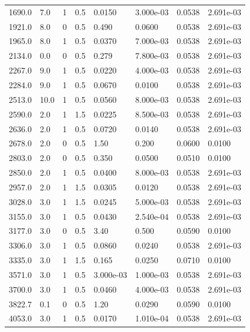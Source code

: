 \documentclass[preview]{standalone}
\begin{document}
{{\begin{tabular}{L{1.2cm}C{1.2cm} C{0.3cm}C{0.5cm} C{1.4cm}C{1.4cm} C{1.4cm}C{1.4cm}}
  1690.0  &   7.0  & 1     & 0.5 &  0.0150  & 3.000e-03  & 0.0538 &  2.691e-03   \\ 
  1921.0  &   8.0  & 0     & 0.5 &  0.490  & 0.0600  & 0.0538 &  2.691e-03   \\ 
  1965.0  &   8.0  & 1     & 0.5 &  0.0370  & 7.000e-03  & 0.0538 &  2.691e-03   \\ 
  2134.0  &   0.0  & 0     & 0.5 &  0.279  & 7.800e-03  & 0.0538 &  2.691e-03   \\ 
  2267.0  &   9.0  & 1     & 0.5 &  0.0220  & 4.000e-03  & 0.0538 &  2.691e-03   \\ 
  2284.0  &   9.0  & 1     & 0.5 &  0.0670  & 0.0100  & 0.0538 &  2.691e-03   \\ 
  2513.0  &  10.0  & 1     & 0.5 &  0.0560  & 8.000e-03  & 0.0538 &  2.691e-03   \\ 
  2590.0  &   2.0  & 1     & 1.5 &  0.0225  & 8.500e-03  & 0.0538 &  2.691e-03   \\ 
  2636.0  &   2.0  & 1     & 0.5 &  0.0720  & 0.0140  & 0.0538 &  2.691e-03   \\ 
  2678.0  &   2.0  & 0     & 0.5 &  1.50  & 0.200  & 0.0600 &  0.0100   \\ 
  2803.0  &   2.0  & 0     & 0.5 &  0.350  & 0.0500  & 0.0510 &  0.0100   \\ 
  2850.0  &   2.0  & 1     & 0.5 &  0.0400  & 8.000e-03  & 0.0538 &  2.691e-03   \\ 
  2957.0  &   2.0  & 1     & 1.5 &  0.0305  & 0.0120  & 0.0538 &  2.691e-03   \\ 
  3028.0  &   3.0  & 1     & 1.5 &  0.0245  & 5.000e-03  & 0.0538 &  2.691e-03   \\ 
  3155.0  &   3.0  & 1     & 0.5 &  0.0430  & 2.540e-04  & 0.0538 &  2.691e-03   \\ 
  3177.0  &   3.0  & 0     & 0.5 &  3.40  & 0.500  & 0.0590 &  0.0100   \\ 
  3306.0  &   3.0  & 1     & 0.5 &  0.0860  & 0.0240  & 0.0538 &  2.691e-03   \\ 
  3335.0  &   3.0  & 1     & 1.5 &  0.165  & 0.0250  & 0.0710 &  0.0100   \\ 
  3571.0  &   3.0  & 1     & 0.5 &  3.000e-03  & 1.000e-03  & 0.0538 &  2.691e-03   \\ 
  3700.0  &   3.0  & 1     & 0.5 &  0.0460  & 4.000e-03  & 0.0538 &  2.691e-03   \\ 
  3822.7  &   0.1  & 0     & 0.5 &  1.20  & 0.0290  & 0.0590 &  0.0100   \\ 
  4053.0  &   3.0  & 1     & 0.5 &  0.0170  & 1.010e-04  & 0.0538 &  2.691e-03   \\ 

\end{tabular}}}
\end{document}
